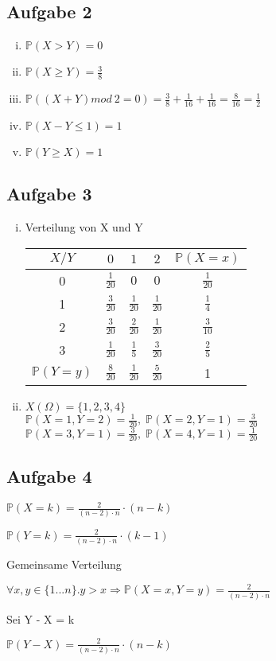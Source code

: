 \documentclass[10pt,a4paper,parskip=half]{scrartcl}
\begin{document}
\subsection*{Aufgabe 2}
\begin{enumerate}[(i)]
\item
$\mathbb{P}(X > Y) = 0$
\item
$\mathbb{P}(X \geq Y) = \frac{3}{8}$
\item
$\mathbb{P}((X + Y ) mod \: 2 = 0) = \frac{3}{8} + \frac{1}{16} + \frac{1}{16} = \frac{8}{16} = \frac{1}{2}$
\item
$\mathbb{P}(X - Y \leq 1) = 1$
\item
$\mathbb{P}(Y \geq X) = 1$
\end{enumerate}

\subsection*{Aufgabe 3}
\begin{enumerate}[(i)]
\item
Verteilung von X und Y
\begin{tabular}{c | c c c | c}
$X/Y$ & $0$ & $1$ & $2$ & $\mathbb{P}(X=x) $\\ \hline
0 & $\frac{1}{20}$ & $0$ & $0$ & $\frac{1}{20}$ \\
1 & $\frac{3}{20}$ & $\frac{1}{20}$ & $\frac{1}{20}$ & $\frac{1}{4}$ \\
2 & $\frac{3}{20}$ & $\frac{2}{20}$ & $\frac{1}{20}$ & $\frac{3}{10}$ \\
3 & $\frac{1}{20}$ & $\frac{1}{5}$ & $\frac{3}{20}$ & $\frac{2}{5}$ \\ \hline
$\mathbb{P}(Y=y)$ & $\frac{8}{20}$ & $\frac{1}{20}$ & $\frac{5}{20}$ & 1
\end{tabular}
\item
$X(\Omega) = \{1,2,3,4\}$ \\
$\mathbb{P}(X=1, Y=2) = \frac{1}{20}, \; \mathbb{P}(X=2, Y=1) = \frac{3}{20}$ \\
$\mathbb{P}(X=3, Y=1) = \frac{3}{20}, \; \mathbb{P}(X=4, Y=1) = \frac{1}{20}$
\end{enumerate}

\subsection*{Aufgabe 4}
\begin{center}
$\mathbb{P}(X=k) = \frac{2}{(n-2)\cdot n} \cdot (n-k)$ \\
\end{center}
\begin{center}
$\mathbb{P}(Y=k) = \frac{2}{(n-2)\cdot n} \cdot (k-1)$ \\
\end{center}
Gemeinsame Verteilung
\begin{center}
$\forall x,y \in \{1...n\} . y > x \Rightarrow \mathbb{P}(X=x, Y=y) = \frac{2}{(n-2)\cdot n}$
\end{center}
Sei Y - X = k \\
\begin{center}
$\mathbb{P}(Y-X) = \frac{2}{(n-2)\cdot n} \cdot (n-k)$ \\
\end{center}
\end{document}
